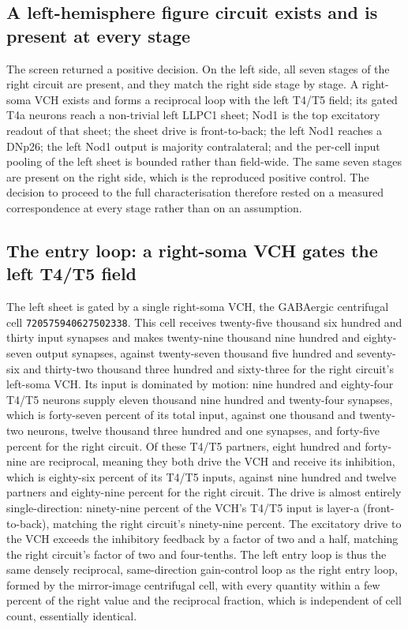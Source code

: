 \documentclass[11pt]{article}
\newcommand{\rid}[1]{\texttt{\small #1}}
\begin{document}
\subsection{A left-hemisphere figure circuit exists and is present at every stage}

The screen returned a positive decision. On the left side, all seven stages of the right circuit
are present, and they match the right side stage by stage. A right-soma VCH exists and forms a
reciprocal loop with the left T4/T5 field; its gated T4a neurons reach a non-trivial left LLPC1
sheet; Nod1 is the top excitatory readout of that sheet; the sheet drive is front-to-back; the
left Nod1 reaches a DNp26; the left Nod1 output is majority contralateral; and the per-cell input
pooling of the left sheet is bounded rather than field-wide. The same seven stages are present on
the right side, which is the reproduced positive control. The decision to proceed to the full
characterisation therefore rested on a measured correspondence at every stage rather than on an
assumption.

\subsection{The entry loop: a right-soma VCH gates the left T4/T5 field}

The left sheet is gated by a single right-soma VCH, the GABAergic centrifugal cell
\rid{720575940627502338}. This cell receives twenty-five thousand six hundred and thirty input
synapses and makes twenty-nine thousand nine hundred and eighty-seven output synapses, against
twenty-seven thousand five hundred and seventy-six and thirty-two thousand three hundred and
sixty-three for the right circuit's left-soma VCH. Its input is dominated by motion: nine hundred
and eighty-four T4/T5 neurons supply eleven thousand nine hundred and twenty-four synapses, which
is forty-seven percent of its total input, against one thousand and twenty-two neurons, twelve
thousand three hundred and one synapses, and forty-five percent for the right circuit. Of these
T4/T5 partners, eight hundred and forty-nine are reciprocal, meaning they both drive the VCH and
receive its inhibition, which is eighty-six percent of its T4/T5 inputs, against nine hundred and
twelve partners and eighty-nine percent for the right circuit. The drive is almost entirely
single-direction: ninety-nine percent of the VCH's T4/T5 input is layer-a (front-to-back),
matching the right circuit's ninety-nine percent. The excitatory drive to the VCH exceeds the
inhibitory feedback by a factor of two and a half, matching the right circuit's factor of two and
four-tenths. The left entry loop is thus the same densely reciprocal, same-direction gain-control
loop as the right entry loop, formed by the mirror-image centrifugal cell, with every quantity
within a few percent of the right value and the reciprocal fraction, which is independent of cell
count, essentially identical.
\end{document}
